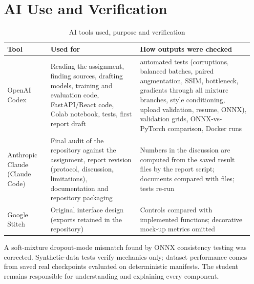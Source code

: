 \documentclass[conference]{IEEEtran}
\begin{document}
\appendices
\section{AI Use and Verification}
\begin{table}[!ht]\centering\caption{AI tools used, purpose and verification}\scriptsize
\renewcommand{\arraystretch}{1.12}\begin{tabular}{>{\raggedright\arraybackslash}p{.16\linewidth}>{\raggedright\arraybackslash}p{.34\linewidth}>{\raggedright\arraybackslash}p{.32\linewidth}}\toprule
Tool & Used for & How outputs were checked\\\midrule
OpenAI Codex & Reading the assignment, finding sources, drafting models, training and evaluation code, FastAPI/React code, Colab notebook, tests, first report draft & 20 automated tests (corruptions, balanced batches, paired augmentation, SSIM, bottleneck, gradients through all mixture branches, style conditioning, upload validation, resume, ONNX), validation grids, ONNX-vs-PyTorch comparison, Docker runs\\
Anthropic Claude (Claude Code) & Final audit of the repository against the assignment, report revision (protocol, discussion, limitations), documentation and repository packaging & Numbers in the discussion are computed from the saved result files by the report script; documents compared with files; tests re-run\\
Google Stitch & Original interface design (exports retained in the repository) & Controls compared with implemented functions; decorative mock-up metrics omitted\\\bottomrule
\end{tabular}\end{table}
A soft-mixture dropout-mode mismatch found by ONNX consistency testing was
corrected. Synthetic-data tests verify mechanics only; dataset performance
comes from saved real checkpoints evaluated on deterministic manifests.
The student remains responsible for understanding and explaining every
component.
\end{document}
